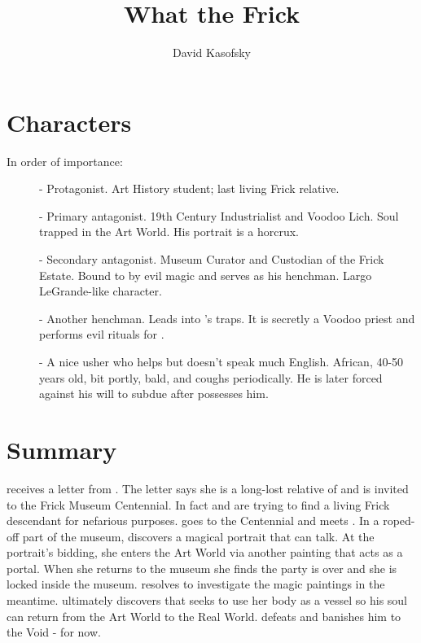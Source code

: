 \documentclass{article}
\title{What the Frick}
\author{David Kasofsky}
\begin{document}
\maketitle{}

\section*{Characters}
In order of importance:
\begin{description}
  \item[\cyl{}] - Protagonist. Art History student; last living Frick relative.
  \item[\cfrick{}] - Primary antagonist. 19th Century Industrialist and Voodoo Lich. Soul trapped in the Art World. His portrait is a horcrux. 
  \item[\ccurator{}] - Secondary antagonist. Museum Curator and Custodian of the Frick Estate. Bound to \cfrick{} by evil magic and serves as his henchman. Largo LeGrande-like character.
  \item[\iaudioguide{}] - Another \cfrick{} henchman. Leads \cyl{} into \cfrick{}'s traps. It is secretly a Voodoo priest and performs evil rituals for \cfrick{}. 
  \item[\ccoughy{}] - A nice usher who helps \cyl{} but doesn't speak much English. African, 40-50 years old, bit portly, bald, and coughs periodically. He is later forced against his will to subdue \cyl{} after \iaudioguide{} possesses him.
\end{description}

\section*{Summary}
\cyl{} receives a letter from \ccurator{}. The letter says she is a long-lost relative of \cfrick{} and is invited to the Frick Museum Centennial. In fact \ccurator{} and \cfrick{} are trying to find a living Frick descendant for nefarious purposes. \cyl{} goes to the Centennial and meets \ccurator{}. In a roped-off part of the museum, \cyl{} discovers a magical portrait that can talk. At the portrait's bidding, she enters the Art World via another painting that acts as a portal. When she returns to the museum she finds the party is over and she is locked inside the museum. \cyl{} resolves to investigate the magic paintings in the meantime. \cyl{} ultimately discovers that \cfrick{} seeks to use her body as a vessel so his soul can return from the Art World to the Real World. \cyl{} defeats \cfrick{} and banishes him to the Void - for now.
\end{document}
